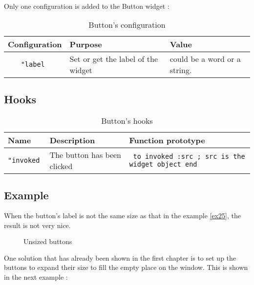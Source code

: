 Only one configuration is added to the Button widget :
\begin{table}[ht]
\centering
\begin{tabular}{|c|p{5cm}|p{5cm}|}
\hline
\bf Configuration & \bf Purpose & \bf Value \\
\hline
\tt "label\index{Button@\textbf{Button}!Configuration!label} & Set or get the label of the widget & could be a word or a string.\\
\hline
\end{tabular}
\caption{Button's configuration}
\end{table}

\subsection{Hooks}

\begin{table}[h!]
\centering
\begin{tabular}{|l|p{4cm}|p{4cm}|}
\hline
\bf Name & \bf Description & \bf Function prototype \\
\hline
\tt "invoked\index{Button@\textbf{Button}!Hooks!invoked} & The button has been clicked & {\tt
to invoked :src\newline
; src is the widget object\newline
end
}\\
\hline
\end{tabular}
\caption{Button's hooks}
\end{table}

\subsection{Example}


When the button's label is not the same size as that in the example \ref{ex25}, the result is not very nice. 

\begin{figure}[h!]
\centering
{}
\label{s25}
\caption{Unsized buttons}
\end{figure}

One solution that has already been shown in the first chapter is to set up the buttons to expand their size to fill the empty place on the window.  This is shown in the next example :

